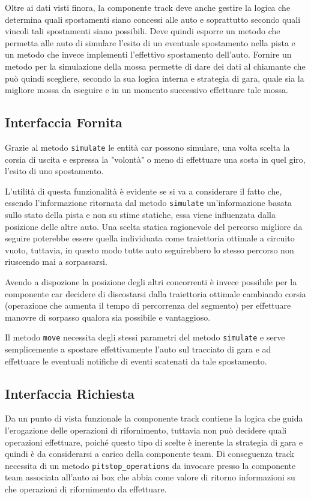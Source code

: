 \documentclass[11pt,a4paper]{report}
\newcommand{\fun}[1]{\texttt{#1}}
\begin{document}
Oltre ai dati visti finora, la componente track deve anche gestire la logica che determina quali spostamenti siano concessi alle auto e soprattutto secondo quali vincoli tali spostamenti siano possibili. Deve quindi esporre un metodo che permetta alle auto di simulare l'esito di un eventuale spostamento nella pista e un metodo che invece implementi l'effettivo spostamento dell'auto. Fornire un metodo per la simulazione della mossa permette di dare dei dati al chiamante che può quindi scegliere, secondo la sua logica interna e strategia di gara, quale sia la migliore mossa da eseguire e in un momento successivo effettuare tale mossa.
\subsection*{Interfaccia Fornita}
Grazie al metodo \fun{simulate} le entità car possono simulare, una volta scelta la corsia di uscita e espressa la "volontà" o meno di effettuare una sosta in quel giro, l'esito di uno spostamento.

L'utilità di questa funzionalità è evidente se si va a considerare il fatto che, essendo l'informazione ritornata dal metodo \fun{simulate} un'informazione basata sullo stato della pista e non su stime statiche, essa viene influenzata dalla posizione delle altre auto. Una scelta statica ragionevole del percorso migliore da seguire poterebbe essere quella individuata come traiettoria ottimale a circuito vuoto, tuttavia, in questo modo tutte auto seguirebbero lo stesso percorso non riuscendo mai a sorpassarsi.

Avendo a dispozione la posizione degli altri concorrenti è invece possibile per la componente car decidere di discostarsi dalla traiettoria ottimale cambiando corsia (operazione che aumenta il tempo di percorrenza del segmento) per effettuare manovre di sorpasso qualora sia possibile e vantaggioso.

Il metodo \fun{move} necessita degli stessi parametri del metodo \fun{simulate} e serve semplicemente a spostare effettivamente l'auto sul tracciato di gara e ad effettuare le eventuali notifiche di eventi scatenati da tale spostamento.
\subsection*{Interfaccia Richiesta}
Da un punto di vista funzionale la componente track contiene la logica che guida l'erogazione delle operazioni di rifornimento, tuttavia non può decidere quali operazioni effettuare, poiché questo tipo di scelte è inerente la strategia di gara e quindi è da considerarsi a carico della componente team. Di conseguenza track necessita di un metodo \fun{pitstop\_operations} da invocare presso la componente team associata all'auto ai box che abbia come valore di ritorno informazioni su che operazioni di rifornimento da effettuare.
\end{document}
